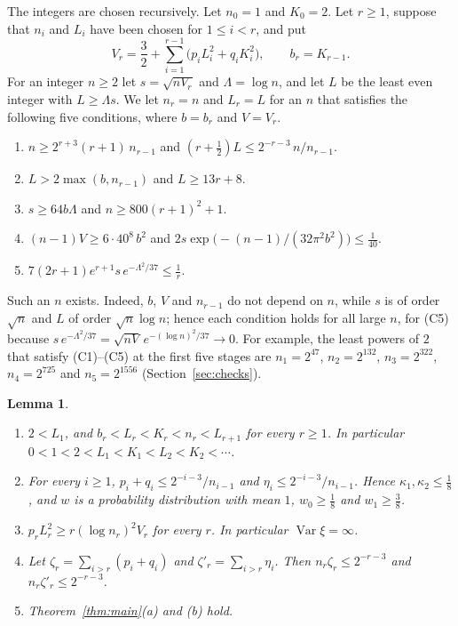 \documentclass[11pt]{amsart}
\newtheorem{lemma}[theorem]{Lemma}
\numberwithin{equation}{section}
\DeclareMathOperator{\Var}{Var}
\begin{document}
The integers are chosen recursively. Let $n_0=1$ and $K_0=2$. Let $r\ge1$, suppose that $n_i$ and $L_i$ have been chosen for $1\le i<r$, and put
\[
V_r=\frac32+\sum_{i=1}^{r-1}\bigl(p_iL_i^2+q_iK_i^2\bigr),\qquad b_r=K_{r-1}.
\]
For an integer $n\ge2$ let $s=\sqrt{nV_r}$ and $\Lambda=\log n$, and let $L$ be the least even integer with $L\ge\Lambda s$. We let $n_r=n$ and $L_r=L$ for an $n$ that satisfies the following five conditions, where $b=b_r$ and $V=V_r$.
\begin{enumerate}[label=\textup{(C\arabic*)},leftmargin=3.2em]
\item $n\ge2^{r+3}(r+1)\,n_{r-1}$ and $(r+\frac12)L\le2^{-r-3}\,n/n_{r-1}$.
\item $L>2\max(b,n_{r-1})$ and $L\ge13r+8$.
\item $s\ge64b\Lambda$ and $n\ge800(r+1)^2+1$.
\item $(n-1)V\ge6\cdot40^8\,b^2$ and $2s\exp\bigl(-(n-1)/(32\pi^2b^2)\bigr)\le\frac1{40}$.
\item $7(2r+1)e^{r+1}s\,e^{-\Lambda^2/37}\le\frac1r$.
\end{enumerate}
Such an $n$ exists. Indeed, $b$, $V$ and $n_{r-1}$ do not depend on $n$, while $s$ is of order $\sqrt n$ and $L$ of order $\sqrt n\log n$; hence each condition holds for all large $n$, for (C5) because $s\,e^{-\Lambda^2/37}=\sqrt{nV}\,e^{-(\log n)^2/37}\to0$. For example, the least powers of $2$ that satisfy (C1)--(C5) at the first five stages are $n_1=2^{47}$, $n_2=2^{132}$, $n_3=2^{322}$, $n_4=2^{725}$ and $n_5=2^{1556}$ (Section~\ref{sec:checks}).

\begin{lemma}\label{lem:w}
\begin{enumerate}[label=\textup{(\alph*)}]
\item $2<L_1$, and $b_r<L_r<K_r<n_r<L_{r+1}$ for every $r\ge1$. In particular $0<1<2<L_1<K_1<L_2<K_2<\cdots$.
\item For every $i\ge1$, $p_i+q_i\le2^{-i-3}/n_{i-1}$ and $\eta_i\le2^{-i-3}/n_{i-1}$. Hence $\kappa_1,\kappa_2\le\frac18$, and $w$ is a probability distribution with mean $1$, $w_0\ge\frac18$ and $w_1\ge\frac38$.
\item $p_rL_r^2\ge r(\log n_r)^2V_r$ for every $r$. In particular $\Var\xi=\infty$.
\item Let $\zeta_r=\sum_{i>r}(p_i+q_i)$ and $\zeta'_r=\sum_{i>r}\eta_i$. Then $n_r\zeta_r\le2^{-r-3}$ and $n_r\zeta'_r\le2^{-r-3}$.
\item Theorem~\ref{thm:main}\textup{(a)} and \textup{(b)} hold.
\end{enumerate}
\end{lemma}
\end{document}
